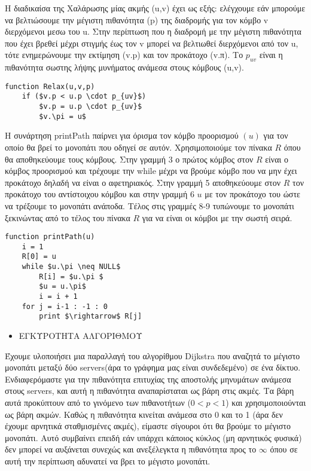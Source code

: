 \documentclass[a4paper,11pt]{article}
\begin{document}
Η διαδικαίσα της Χαλάρωσης μίας ακμής (u,v) έχει ως εξής: ελέγχουμε εάν μπορούμε να βελτιώσουμε την μέγιστη πιθανότητα (p) της διαδρομής για τον κόμβο v διερχόμενοι μεσω του u. Στην περίπτωση που η διαδρομή με την μέγιστη πιθανότητα που έχει βρεθεί μέχρι στιγμής έως τον v μπορεί να βελτιωθεί διερχόμενοι από τον u, τότε ενημερώνουμε την εκτίμηση (v.p) και τον προκάτοχο (v.π). Το $p_{uv}$ είναι η πιθανότητα σωστης λήψης μυνήματος ανάμεσα στους κόμβους (u,v).

\begin{lstlisting}[mathescape]
function Relax(u,v,p)
    if ($v.p < u.p \cdot p_{uv}$)
        $v.p = u.p \cdot p_{uv}$
        $v.\pi = u$
\end{lstlisting}

\newpage

Η συνάρτηση printPath παίρνει για όρισμα τον κόμβο προορισμού $(u)$ για τον οποίο θα βρεί το μονοπάτι που οδηγεί σε αυτόν. Χρησιμοποιούμε τον πίνακα $R$ όπου θα αποθηκεύουμε τους κόμβους. Στην γραμμή 3 ο πρώτος κόμβος στον $R$ είναι ο κόμβος προορισμού και τρέχουμε την while μέχρι να βρούμε κόμβο που να μην έχει προκάτοχο δηλαδή να είναι ο αφετηριακός. Στην γραμμή 5 αποθηκεύουμε στον $R$ τον προκάτοχο του αντίστοιχου κόμβου και στην γραμμή 6 $u$ με τον προκάτοχο του ώστε να τρέξουμε το μονοπάτι ανάποδα. Τέλος στις γραμμές 8-9 τυπώνουμε το μονοπάτι ξεκινώντας από το τέλος του πίνακα $R$ για να είναι οι κόμβοι με την σωστή σειρά.

\begin{lstlisting}[mathescape]
function printPath(u)
    i = 1
    R[0] = u
    while $u.\pi \neq NULL$
        R[i] = $u.\pi $
        $u = u.\pi$
        i = i + 1 
    for j = i-1 : -1 : 0
        print $\rightarrow$ R[j]
\end{lstlisting}

\begin{itemize}
\item ΕΓΚΥΡΟΤΗΤΑ ΑΛΓΟΡΙΘΜΟΥ
\end{itemize}

Έχουμε υλοποιήσει μια παραλλαγή του αλγορίθμου Dijkstra που αναζητά το μέγιστο μονοπάτι μεταξύ δύο servers(άρα το γράφημα μας είναι συνδεδεμένο) σε ένα δίκτυο. Ενδιαφερόμαστε για την πιθανότητα επιτυχίας της αποστολής μηνυμάτων ανάμεσα στους servers, και αυτή η πιθανότητα αναπαρίσταται ως βάρη στις ακμές. Τα βάρη αυτά προκύπτουν από το γινόμενο των πιθανοτήτων ($0<p<1$) και χρησιμοποιούνται ως βάρη ακμών.
Καθώς η πιθανότητα  κινείται  ανάμεσα στο 0 και το 1 (άρα δεν έχουμε αρνητικά σταθμισμένες ακμές), είμαστε σίγουροι ότι θα βρούμε το μέγιστο μονοπάτι. Αυτό συμβαίνει επειδή εάν υπάρχει κάποιος  κύκλος (μη αρνητικός φυσικά) δεν μπορεί να αυξάνεται συνεχώς και ανεξέλεγκτα η πιθανότητα προς το $\infty$  όπου σε αυτή την περίπτωση αδυνατεί να  βρει το μέγιστο μονοπάτι.
 
\end{document}
